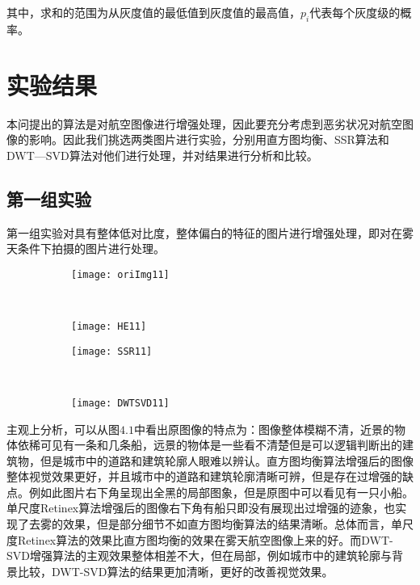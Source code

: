 其中，求和的范围为从灰度值的最低值到灰度值的最高值，$p_i$代表每个灰度级的概率。

		\section{实验结果}本问提出的算法是对航空图像进行增强处理，因此要充分考虑到恶劣状况对航空图像的影响。因此我们挑选两类图片进行实验，分别用直方图均衡、SSR算法和DWT—SVD算法对他们进行处理，并对结果进行分析和比较。
			\subsection{第一组实验}第一组实验对具有整体低对比度，整体偏白的特征的图片进行增强处理，即对在雾天条件下拍摄的图片进行处理。

\begin{figure}[!htbp]
    \centering
    \begin{subfigure}[b]{0.5\textwidth}
      \texttt{[image: oriImg11]}
      \caption{}
      \label{fig:oaspl_a}
    \end{subfigure}%
    ~%
    \begin{subfigure}[b]{0.5\textwidth}
      \texttt{[image: HE11]}
      \caption{}
      \label{fig:oaspl_b}
    \end{subfigure}
    \begin{subfigure}[b]{0.5\textwidth}
      \texttt{[image: SSR11]}
      \caption{}
      \label{fig:oaspl_c}
    \end{subfigure}%
    ~%
    \begin{subfigure}[b]{0.5\textwidth}
      \texttt{[image: DWTSVD11]}
      \caption{}
      \label{fig:oaspl_d}
    \end{subfigure}
    \label{fig:oaspl}
\end{figure}

主观上分析，可以从图$4.1$中看出原图像的特点为：图像整体模糊不清，近景的物体依稀可见有一条和几条船，远景的物体是一些看不清楚但是可以逻辑判断出的建筑物，但是城市中的道路和建筑轮廓人眼难以辨认。直方图均衡算法增强后的图像整体视觉效果更好，并且城市中的道路和建筑轮廓清晰可辨，但是存在过增强的缺点。例如此图片右下角呈现出全黑的局部图象，但是原图中可以看见有一只小船。单尺度Retinex算法增强后的图像右下角有船只即没有展现出过增强的迹象，也实现了去雾的效果，但是部分细节不如直方图均衡算法的结果清晰。总体而言，单尺度Retinex算法的效果比直方图均衡的效果在雾天航空图像上来的好。而DWT-SVD增强算法的主观效果整体相差不大，但在局部，例如城市中的建筑轮廓与背景比较，DWT-SVD算法的结果更加清晰，更好的改善视觉效果。

